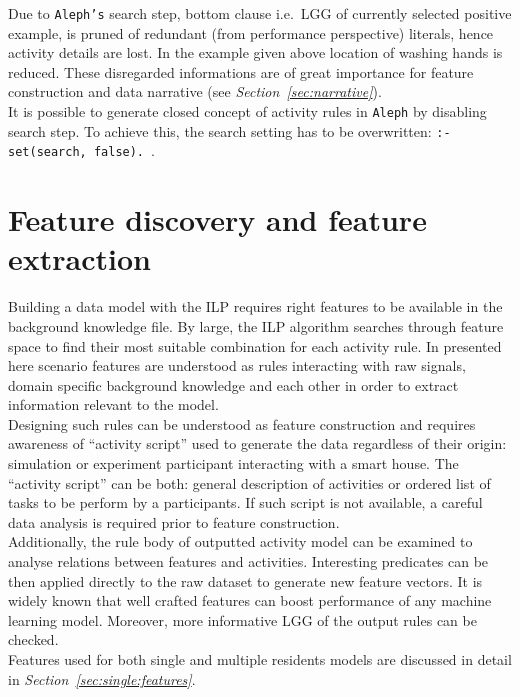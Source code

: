 \documentclass[10pt, a4paper, pdflatex, leqno, twoside, openright]{report}
\begin{document}
Due to \texttt{Aleph's} search step, bottom clause i.e.\ LGG of currently selected positive example, is pruned of redundant (from performance perspective) literals, hence activity details are lost. In the example given above location of washing hands is reduced. These disregarded informations are of great importance for feature construction and data narrative (see \emph{Section~\ref{sec:narrative}}).\\

It is possible to generate closed concept of activity rules in \texttt{Aleph} by disabling search step. To achieve this, the search setting has to be overwritten: \texttt{:- set(search, false).}~.

  \section{Feature discovery and feature extraction}
Building a data model with the ILP requires right features to be available in the background knowledge file. By large, the ILP algorithm searches through feature space to find their most suitable combination for each activity rule. In presented here scenario features are understood as rules interacting with raw signals, domain specific background knowledge and each other in order to extract information relevant to the model.\\
Designing such rules can be understood as feature construction and requires awareness of ``activity script'' used to generate the data regardless of their origin: simulation or experiment participant interacting with a smart house. The ``activity script'' can be both: general description of activities or ordered list of tasks to be perform by a participants. If such script is not available, a careful data analysis is required prior to feature construction.\\

Additionally, the rule body of outputted activity model can be examined to analyse relations between features and activities. Interesting predicates can be then applied directly to the raw dataset to generate new feature vectors. It is widely known that well crafted features can boost performance of any machine learning model. Moreover, more informative LGG of the output rules can be checked.\\
Features used for both single and multiple residents models are discussed in detail in \emph{Section~\ref{sec:single:features}}.
\end{document}
